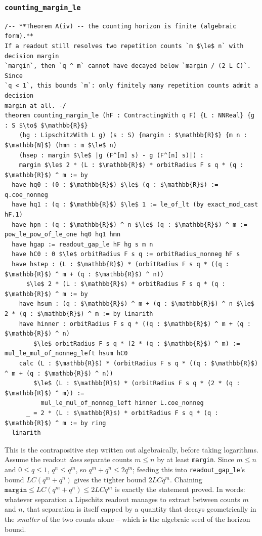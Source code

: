 \documentclass[11pt]{article}
\begin{document}
\subsubsection*{\texttt{counting\_margin\_le}}

\begin{lstlisting}
/-- **Theorem A(iv) -- the counting horizon is finite (algebraic form).**
If a readout still resolves two repetition counts `m $\le$ n` with decision margin
`margin`, then `q ^ m` cannot have decayed below `margin / (2 L C)`.  Since
`q < 1`, this bounds `m`: only finitely many repetition counts admit a decision
margin at all. -/
theorem counting_margin_le (hF : ContractingWith q F) {L : NNReal} {g : S $\to$ $\mathbb{R}$}
    (hg : LipschitzWith L g) (s : S) {margin : $\mathbb{R}$} {m n : $\mathbb{N}$} (hmn : m $\le$ n)
    (hsep : margin $\le$ |g (F^[m] s) - g (F^[n] s)|) :
    margin $\le$ 2 * (L : $\mathbb{R}$) * orbitRadius F s q * (q : $\mathbb{R}$) ^ m := by
  have hq0 : (0 : $\mathbb{R}$) $\le$ (q : $\mathbb{R}$) := q.coe_nonneg
  have hq1 : (q : $\mathbb{R}$) $\le$ 1 := le_of_lt (by exact_mod_cast hF.1)
  have hpn : (q : $\mathbb{R}$) ^ n $\le$ (q : $\mathbb{R}$) ^ m := pow_le_pow_of_le_one hq0 hq1 hmn
  have hgap := readout_gap_le hF hg s m n
  have hC0 : 0 $\le$ orbitRadius F s q := orbitRadius_nonneg hF s
  have hstep : (L : $\mathbb{R}$) * (orbitRadius F s q * ((q : $\mathbb{R}$) ^ m + (q : $\mathbb{R}$) ^ n))
      $\le$ 2 * (L : $\mathbb{R}$) * orbitRadius F s q * (q : $\mathbb{R}$) ^ m := by
    have hsum : (q : $\mathbb{R}$) ^ m + (q : $\mathbb{R}$) ^ n $\le$ 2 * (q : $\mathbb{R}$) ^ m := by linarith
    have hinner : orbitRadius F s q * ((q : $\mathbb{R}$) ^ m + (q : $\mathbb{R}$) ^ n)
        $\le$ orbitRadius F s q * (2 * (q : $\mathbb{R}$) ^ m) := mul_le_mul_of_nonneg_left hsum hC0
    calc (L : $\mathbb{R}$) * (orbitRadius F s q * ((q : $\mathbb{R}$) ^ m + (q : $\mathbb{R}$) ^ n))
        $\le$ (L : $\mathbb{R}$) * (orbitRadius F s q * (2 * (q : $\mathbb{R}$) ^ m)) :=
          mul_le_mul_of_nonneg_left hinner L.coe_nonneg
      _ = 2 * (L : $\mathbb{R}$) * orbitRadius F s q * (q : $\mathbb{R}$) ^ m := by ring
  linarith
\end{lstlisting}

This is the contrapositive step written out algebraically, before taking
logarithms. Assume the readout \emph{does} separate counts $m\le n$ by at
least \texttt{margin}. Since $m\le n$ and $0\le q\le 1$, $q^n\le q^m$, so
$q^m+q^n \le 2q^m$; feeding this into \texttt{readout\_gap\_le}'s bound
$LC(q^m+q^n)$ gives the tighter bound $2LCq^m$. Chaining
$\texttt{margin} \le LC(q^m+q^n) \le 2LCq^m$ is exactly the statement proved.
In words: whatever separation a Lipschitz readout manages to extract between
counts $m$ and $n$, that separation is itself capped by a quantity that decays
geometrically in the \emph{smaller} of the two counts alone -- which is the
algebraic seed of the horizon bound.
\end{document}
